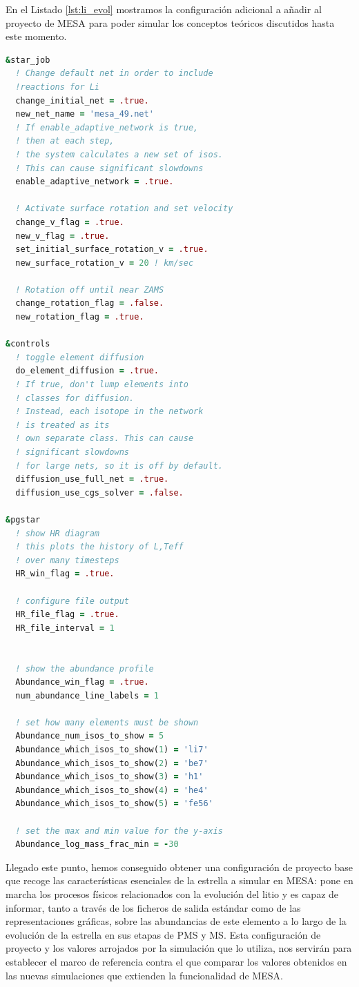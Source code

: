 En el Listado \ref{lst:li_evol} mostramos la configuración adicional a añadir al proyecto de MESA para poder simular los conceptos teóricos discutidos hasta este momento.
\begin{lstlisting}[language=Fortran, float, caption={Parametrización de los procesos relacionados con el tratamiento del litio y su evolución temporal.}, label={lst:li_evol}]
&star_job
  ! Change default net in order to include 
  !reactions for Li
  change_initial_net = .true.
  new_net_name = 'mesa_49.net'
  ! If enable_adaptive_network is true, 
  ! then at each step, 
  ! the system calculates a new set of isos. 
  ! This can cause significant slowdowns
  enable_adaptive_network = .true.

  ! Activate surface rotation and set velocity
  change_v_flag = .true.
  new_v_flag = .true.
  set_initial_surface_rotation_v = .true.
  new_surface_rotation_v = 20 ! km/sec 

  ! Rotation off until near ZAMS
  change_rotation_flag = .false.
  new_rotation_flag = .true.

&controls
  ! toggle element diffusion
  do_element_diffusion = .true.
  ! If true, don't lump elements into 
  ! classes for diffusion. 
  ! Instead, each isotope in the network 
  ! is treated as its 
  ! own separate class. This can cause 
  ! significant slowdowns 
  ! for large nets, so it is off by default.
  diffusion_use_full_net = .true.
  diffusion_use_cgs_solver = .false.

&pgstar
  ! show HR diagram
  ! this plots the history of L,Teff 
  ! over many timesteps
  HR_win_flag = .true.

  ! configure file output 
  HR_file_flag = .true.
  HR_file_interval = 1


  ! show the abundance profile
  Abundance_win_flag = .true.
  num_abundance_line_labels = 1

  ! set how many elements must be shown
  Abundance_num_isos_to_show = 5
  Abundance_which_isos_to_show(1) = 'li7'
  Abundance_which_isos_to_show(2) = 'be7'
  Abundance_which_isos_to_show(3) = 'h1'
  Abundance_which_isos_to_show(4) = 'he4'
  Abundance_which_isos_to_show(5) = 'fe56'

  ! set the max and min value for the y-axis
  Abundance_log_mass_frac_min = -30
\end{lstlisting}

Llegado este punto, hemos conseguido obtener una configuración de proyecto base que recoge las características esenciales de la estrella a simular en MESA: pone en marcha los procesos físicos relacionados con la evolución del litio y es capaz de informar, tanto a través de los ficheros de salida estándar como de las representaciones gráficas, sobre las abundancias de este elemento a lo largo de la evolución de la estrella en sus etapas de PMS y MS. Esta configuración de proyecto y los valores arrojados por la simulación que lo utiliza, nos servirán para establecer el marco de referencia contra el que comparar los valores obtenidos en las nuevas simulaciones que extienden la funcionalidad de MESA.\par

